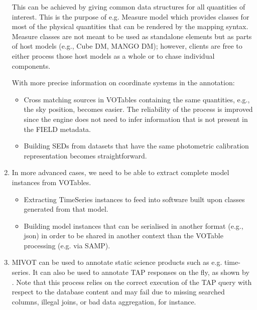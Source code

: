 \begin{enumerate}
  This can be achieved by giving  common data structures for all 
  quantities of interest. This is the purpose of e.g. Measure model 
  which provides classes for most of the physical quantities that can 
  be rendered by the mapping syntax. Measure classes are not meant to 
  be used as standalone elements but as parts of host models 
  (e.g., Cube DM, MANGO DM);
  however, clients are free to either process those host models as a
  whole or to chase individual components.
  
  With more precise information on coordinate systems in the annotation:
    \begin{itemize}
      \item Cross matching sources in VOTables containing the same
      quantities, e.g., the sky position, becomes easier.
            The reliability of the process is improved since the engine does not need to infer information that is not present in the FIELD metadata.
      \item Building SEDs from datasets that have the same photometric calibration representation becomes straightforward.
   \end{itemize}          

  \item In more advanced cases, we need to be able to extract complete model instances from VOTables.
    \begin{itemize}
      \item Extracting  TimeSeries instances to feed into software built upon classes generated from that model.
      \item Building model instances that can be serialised in another
      format (e.g., json) in order to be shared in another context than 
            the VOTable processing (e.g. via SAMP).
   \end{itemize}         
    
   \item MIVOT can be used to annotate static science products such as e.g. time-series. It can also be used to annotate 
    TAP responses on the fly, as shown by \cite{2201.01732}. Note that this process relies on the correct execution of the TAP query 
    with respect to the database content and may fail due to missing searched columns, illegal joins, or bad data aggregation, for instance. 
   
    
\end{enumerate} 

